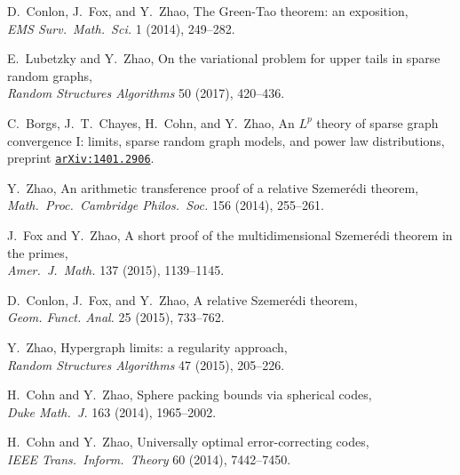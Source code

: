 \documentclass[11pt]{amsart}
\newcommand{\arXiv}[1]{\href{http://arxiv.org/abs/#1}{\tt arXiv:#1}}
\renewcommand{\j}[1]{{\frenchspacing\itshape #1}}
\begin{document}
\begin{etaremune}[leftmargin=0.3in,itemsep=4pt,topsep=0pt,partopsep=0pt,parsep=0pt]
\item D.~Conlon, J.~Fox, and Y.~Zhao,
  The Green-Tao theorem: an exposition, \\
  \j{EMS Surv.~Math.~Sci.} 1 (2014), 249--282.

\item E.~Lubetzky and Y.~Zhao,
  On the variational problem for upper tails in sparse random graphs, \\
  \j{Random Structures Algorithms} 50 (2017), 420--436.

\item C.~Borgs, J.~T.~Chayes, H.~Cohn, and Y.~Zhao, 
  An $L^p$ theory of sparse graph convergence I: limits, sparse random
  graph models, and power law distributions,
  preprint \arXiv{1401.2906}.

\item Y.~Zhao,
  An arithmetic transference proof of a relative Szemer\'edi theorem, \\
  \j{Math.~Proc.~Cambridge Philos.~Soc.} 156 (2014), 255--261.

\item J.~Fox and Y.~Zhao,
  A short proof of the multidimensional Szemer\'edi theorem in the primes, \\
  \j{Amer.~J.~Math.} 137 (2015), 1139--1145.

\item D.~Conlon, J.~Fox, and Y.~Zhao,
  A relative Szemer\'edi theorem,  \\
  \j{Geom. Funct. Anal.} 25 (2015), 733--762.

\item Y.~Zhao,
  Hypergraph limits: a regularity approach, \\
  \j{Random Structures Algorithms} 47 (2015), 205--226. %

\item H.~Cohn and Y.~Zhao,
  Sphere packing bounds via spherical codes, \\
  \j{Duke Math.~J.} 163 (2014), 1965--2002.

\item H.~Cohn and Y.~Zhao,
  Universally optimal error-correcting codes, \\
  \j{IEEE Trans.~Inform.~Theory} 60 (2014), 7442--7450.


\end{etaremune}
\end{document}

